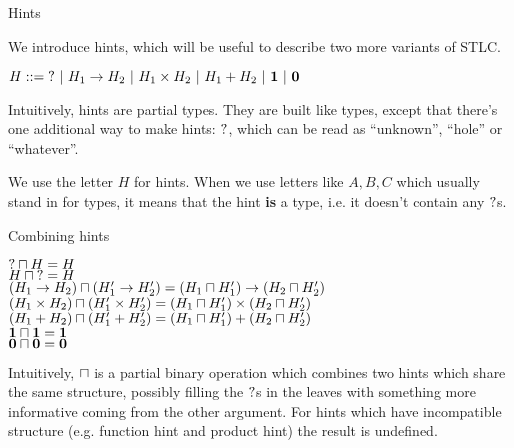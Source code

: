 \documentclass{beamer}
\newcommand{\pipe}{\ |\ }
\newcommand{\Fun}[2]{#1 \to #2}
\newcommand{\Prod}[2]{#1 \times #2}
\newcommand{\Sum}[2]{#1 + #2}
\newcommand{\Unit}{\textbf{1}}
\newcommand{\Empty}{\textbf{0}}
\begin{document}
\begin{frame}{Hints}

We introduce hints, which will be useful to describe two more variants of STLC.

\vspace{2em}

$H ::= \Hint \pipe \Fun{H_1}{H_2} \pipe \Prod{H_1}{H_2} \pipe \Sum{H_1}{H_2} \pipe \Unit \pipe \Empty$

\vspace{2em}

Intuitively, hints are partial types. They are built like types, except that there's one additional way to make hints: $\mathbf{?}$, which can be read as ``unknown'', ``hole'' or ``whatever''.

\vspace{2em}

We use the letter $H$ for hints. When we use letters like $A, B, C$ which usually stand in for types, it means that the hint \textbf{is} a type, i.e. it doesn't contain any $\mathbf{?}$s.

\end{frame}

\begin{frame}{Combining hints}

\begin{center}
  $\mathbf{?} \sqcap H = H$ \\
  $H \sqcap \mathbf{?} = H$ \\
  $\combinehints{(\Fun{H_1}{H_2})}{(\Fun{H'_1}{H'_2})} = \Fun{(\combinehints{H_1}{H'_1})}{(\combinehints{H_2}{H'_2})}$ \\
  $\combinehints{(\Prod{H_1}{H_2})}{(\Prod{H'_1}{H'_2})} = \Prod{(\combinehints{H_1}{H'_1})}{(\combinehints{H_2}{H'_2})}$ \\
  $\combinehints{(\Sum{H_1}{H_2})}{(\Sum{H'_1}{H'_2})} = \Sum{(\combinehints{H_1}{H'_1})}{(\combinehints{H_2}{H'_2})}$ \\
  $\combinehints{\Unit}{\Unit} = \Unit$ \\
  $\combinehints{\Empty}{\Empty} = \Empty$
\end{center}

Intuitively, $\sqcap$ is a partial binary operation which combines two hints which share the same structure, possibly filling the $\mathbf{?}$s in the leaves with something more informative coming from the other argument. For hints which have incompatible structure (e.g. function hint and product hint) the result is undefined.

\end{frame}
\end{document}
